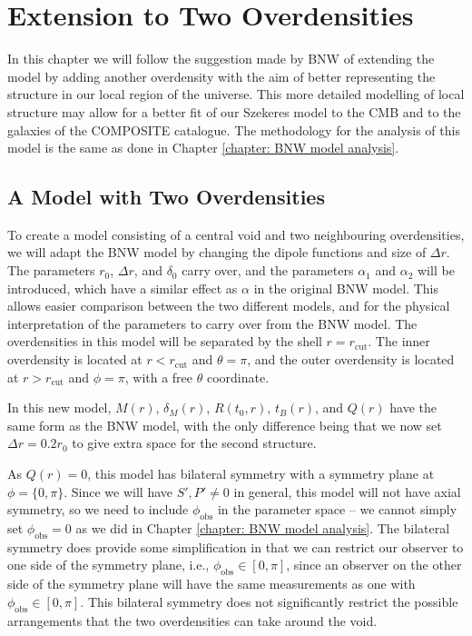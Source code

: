 \documentclass[a4paper,12pt]{report}
\begin{document}
\chapter{Extension to Two Overdensities}\label{chapter: two structures}
In this chapter we will follow the suggestion made by BNW \cite{RN3} of extending the model by adding another overdensity with the aim of better representing the structure in our local region of the universe. This more detailed modelling of local structure may allow for a better fit of our Szekeres model to the CMB and to the galaxies of the COMPOSITE catalogue. The methodology for the analysis of this model is the same as done in Chapter \ref{chapter: BNW model analysis}.

\section{A Model with Two Overdensities}\label{sec: two structure model description}
To create a model consisting of a central void and two neighbouring overdensities, we will adapt the BNW model by changing the dipole functions and size of $\Delta r$. The parameters $r_0$, $\Delta r$, and $\delta_0$ carry over, and the parameters $\alpha_1$ and $\alpha_2$ will be introduced, which have a similar effect as $\alpha$ in the original BNW model. This allows easier comparison between the two different models, and for the physical interpretation of the parameters to carry over from the BNW model. The overdensities in this model will be separated by the shell $r=r_\text{cut}$. The inner overdensity is located at $r<r_\text{cut}$ and $\theta=\pi$, and the outer overdensity is located at $r>r_\text{cut}$ and $\phi=\pi$, with a free $\theta$ coordinate.

In this new model, $M(r)$, $\delta_M(r)$, $R(t_0,r)$, $t_B(r)$, and $Q(r)$ have the same form as the BNW model, with the only difference being that we now set $\Delta r = 0.2 r_0$ to give extra space for the second structure.

As $Q(r) = 0$, this model has bilateral symmetry with a symmetry plane at $\phi = \{0,\pi\}$. Since we will have $S',P' \neq 0$ in general, this model will not have axial symmetry, so we need to include $\phi_\text{obs}$ in the parameter space -- we cannot simply set $\phi_\text{obs} = 0$ as we did in Chapter \ref{chapter: BNW model analysis}. The bilateral symmetry does provide some simplification in that we can restrict our observer to one side of the symmetry plane, i.e., $\phi_\text{obs} \in [0,\pi]$, since an observer on the other side of the symmetry plane will have the same measurements as one with $\phi_\text{obs} \in [0,\pi]$. This bilateral symmetry does not significantly restrict the possible arrangements that the two overdensities can take around the void.
\end{document}
